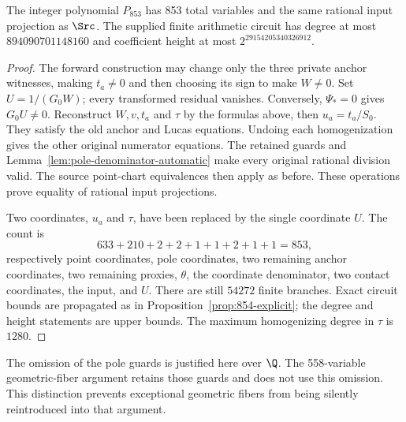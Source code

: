 \begin{proposition}\label{prop:853-explicit}
The integer polynomial $P_{853}$ has 853 total variables and the
same rational input projection as $\Src$. The supplied finite
arithmetic circuit has degree at most $894090701148160$ and
coefficient height at most $2^{29154205340326912}$.
\end{proposition}
\begin{proof}
The forward construction may change only the three private anchor
witnesses, making $t_a\ne0$ and then choosing its sign to make
$W\ne0$. Set $U=1/(G_0W)$; every transformed residual vanishes.
Conversely, $\Psi_*=0$ gives $G_0U\ne0$. Reconstruct $W,v,t_a$
and $\tau$ by the formulas above, then $u_a=t_a/S_0$. They satisfy
the old anchor and Lucas equations. Undoing each homogenization gives
the other original numerator equations. The retained guards and
Lemma~\ref{lem:pole-denominator-automatic} make every original rational
division valid. The source point-chart equivalences then apply as
before. These operations prove equality of rational input projections.

Two coordinates, $u_a$ and $\tau$, have been replaced by the single
coordinate $U$. The count is
\[
 633+210+2+2+1+1+2+1+1=853,
\]
respectively point coordinates, pole coordinates, two remaining anchor
coordinates, two remaining proxies, $\theta$, the coordinate denominator,
two contact coordinates, the input, and $U$. There are still $54272$
finite branches. Exact circuit bounds are propagated as in
Proposition~\ref{prop:854-explicit}; the degree and height statements
are upper bounds. The maximum homogenizing degree in $\tau$ is $1280$.
\end{proof}

The omission of the pole guards is justified here over $\Q$.
The 558-variable geometric-fiber argument retains those guards and
does not use this omission. This distinction prevents exceptional
geometric fibers from being silently reintroduced into that argument.
